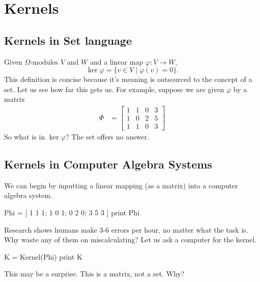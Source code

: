 \documentclass[12pt,twoside,dvipsnames,letterpaper]{memoir}
\author{James B. Wilson}
\date{\today}
\begin{document}
\section*{Kernels}

\subsection{Kernels in Set language}
Given $\Omega$-modules $V$ and $W$ and a linear map $\varphi:V\to W$, 
\[
    \ker \varphi=\{v\in V\mid \varphi(v)=0\}.
\]
This definition is concise because it's meaning
is outsourced to the concept of a set. Let us see how 
far this gets us. 
For example, suppose we are given $\varphi$ by a matrix 
\begin{align*}
    \Phi & = 
    \begin{bmatrix}
        1 & 1 & 0 & 3\\
        1 & 0 & 2 & 5\\
        1 & 1 & 0 & 3
    \end{bmatrix}
\end{align*}
So what is in $\ker\varphi$?  The set 
offers no answer.


\subsection{Kernels in Computer Algebra Systems}
We can begin by inputting a linear mapping (as a matrix) into a computer algebra system.
\begin{notebookin}
Phi = [ 1 1 1; 1 0 1; 0 2 0; 3 5 3 ]
print Phi
\end{notebookin}
\begin{notebookout}[\thenotebookcounter]
[ 1 1 0 3 ]
[ 1 0 2 5 ]
[ 1 1 0 3 ]
\end{notebookout}
Research shows humans make 3-6 errors per hour, no matter 
what the task is.  Why waste any of 
them on miscalculating?  Let us ask a computer for the kernel.
\begin{notebookin}
K = Kernel(Phi)
print K
\end{notebookin}
\begin{notebookout}[\thenotebookcounter]
[ -2 -5 ]
[  2  2 ]
[  1  0 ]
[  0  1 ]
\end{notebookout}
This may be a surprise.  This is a matrix, not a 
set.  Why?
\end{document}
